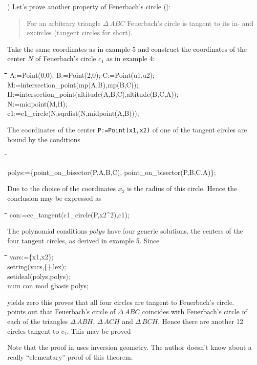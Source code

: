 \documentclass{article}
\newenvironment{code}{\tt \begin{tabbing}
\hspace*{1cm}\=\hspace*{1cm}\=\hspace*{1cm}\=
\hspace*{1cm}\=\hspace*{1cm}\=\kill
}{\end{tabbing}}
\begin{document}
) Let's prove another property of Feuerbach's circle
(\cite[thm. 5.61]{Coxeter:67}): 
\begin{quote}
For an arbitrary triangle $\Delta\,ABC$ Feuerbach's circle is tangent
to its in- and excircles (tangent circles for short).
\end{quote}
Take the same coordinates as in example 5 and construct the
coordinates of the center $N$ of Feuerbach's circle $c_1$ as in
example 4:
\begin{code}\>\+
A:=Point(0,0); B:=Point(2,0); C:=Point(u1,u2);\\
 
M:=intersection\_point(mp(A,B),mp(B,C));\\
H:=intersection\_point(altitude(A,B,C),altitude(B,C,A));\\
N:=midpoint(M,H);\\[6pt]	

c1:=c1\_circle(N,sqrdist(N,midpoint(A,B)));
\end{code}
The coordinates of the center {\tt P:=Point(x1,x2)} of one of the
tangent circles are bound by the conditions
\begin{code}
polys:=\{point\_on\_bisector(P,A,B,C), point\_on\_bisector(P,B,C,A)\};
\end{code}
Due to the choice of the coordinates $x_2$ is the radius of this
circle.  Hence the conclusion may be expressed as
\begin{code}\>
con:=cc\_tangent(c1\_circle(P,x2\^{}2),c1);
\end{code}
The polynomial conditions $polys$ have four generic solutions, the
centers of the four tangent circles, as derived in example 5. Since
\begin{code}\>\+
vars:=\{x1,x2\};\\
setring(vars,\{\},lex);\\
setideal(polys,polys);\\
num con mod gbasis polys;
\end{code}
yields zero this proves that all four circles are tangent to
Feuerbach's circle. \cite[ch.5,\S 6]{Coxeter:67} points out that
Feuerbach's circle of $\Delta\,ABC$ coincides with Feuerbach's circle
of each of the triangles $\Delta\,ABH,\, \Delta\,ACH$ and
$\Delta\,BCH$. Hence there are another 12 circles tangent to
$c_1$. This may be proved




Note that the proof in \cite{Coxeter:67} uses inversion geometry. The
author doesn't know about a really ``elementary'' proof of this
theorem.
\end{document}
